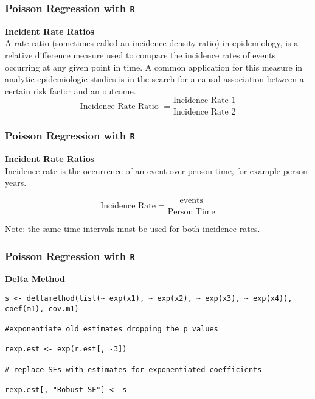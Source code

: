 \documentclass[00-GLMregslides.tex]{subfiles}
\begin{document}
\begin{frame}[fragile]

\frametitle{Poisson Regression with \texttt{R}}
\Large 
\textbf{Incident Rate Ratios}\\
A rate ratio (sometimes called an incidence density ratio) in epidemiology, is a relative difference measure used to compare the incidence rates of events occurring at any given point in time. A common application for this measure in analytic epidemiologic studies is in the search for a causal association between a certain risk factor and an outcome.
\[ \mbox{Incidence Rate Ratio }  = \frac{\mbox{Incidence Rate 1}}{\mbox{Incidence Rate 2}} \]
\end{frame}
\begin{frame}[fragile]

\frametitle{Poisson Regression with \texttt{R}}
\Large 
\textbf{Incident Rate Ratios} \\
Incidence rate is the occurrence of an event over person-time, for example person-years.
 
\[ \mbox{Incidence Rate}  = \frac{\mbox{events}}{\mbox{Person Time}} \]

Note: the same time intervals must be used for both incidence rates.
\end{frame}
\begin{frame}[fragile]

\frametitle{Poisson Regression with \texttt{R}}
\textbf{
Delta Method}

\begin{verbatim}
s <- deltamethod(list(~ exp(x1), ~ exp(x2), ~ exp(x3), ~ exp(x4)), coef(m1), cov.m1)

#exponentiate old estimates dropping the p values

rexp.est <- exp(r.est[, -3])

# replace SEs with estimates for exponentiated coefficients

rexp.est[, "Robust SE"] <- s

\end{verbatim}

\end{frame}
\end{document}
